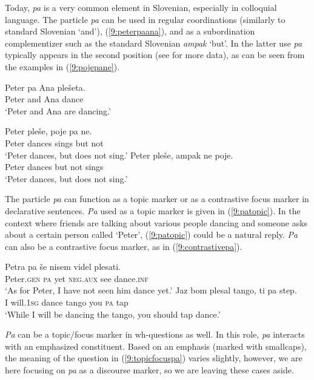 \documentclass[output=paper,
modfonts,
newtxmath,
hidelinks
]{langscibook}
\begin{document}
Today, \textit{pa} is a very common element in Slovenian, especially in colloquial language. The particle \textit{pa} can be used in regular coordinations (similarly to standard Slovenian `and'), (\ref{9:peterpaana}), and as a subordination complementizer such as the standard Slovenian \textit{ampak} `but'. In the latter use \textit{pa} typically appears in the second position (see \citealt{marusicetal2011pa} for more data), as can be seen from the examples in (\ref{9:pojepane}).

\begin{exe}
\ex \label{9:peterpaana}
\gll Peter 	pa Ana plešeta. \\
	Peter 	and Ana dance\\
\trans  `Peter and Ana are dancing.' 
\ex \label{9:pojepane}
\begin{xlist}
\ex \gll	Peter pleše, poje pa ne. \\
 		Peter 	dances sings but not\\
\trans `Peter dances, but does not sing.'
\ex \gll 	Peter pleše, ampak ne poje. \\
 	Peter 	dances but not sings\\
 \trans `Peter dances, but does not sing.'
\end{xlist}
\end{exe}

\noindent The particle \textit{pa} can function as a topic marker or as a contrastive focus marker in declarative sentences. \textit{Pa} used as a topic marker is given in (\ref{9:patopic}). In the context where friends are talking about various people dancing and someone asks about a certain person called `Peter', (\ref{9:patopic}) could be a natural reply. \textit{Pa} can also be a contrastive focus marker, as in (\ref{9:contrastivepa}). 

\begin{exe}
\ex \label{9:patopic}
\gll  Petra 	pa še nisem videl plesati.\\
 	Peter.\textsc{gen} 	\textsc{pa} yet \textsc{neg.aux} see dance.\textsc{inf} \\
\trans   `As for Peter, I have not seen him dance yet.' 
\ex \label{9:contrastivepa}
\gll Jaz bom plesal tango, ti pa step.\\
 	I will.\textsc{1sg} dance tango you \textsc{pa} tap\\
\trans   `While I will be dancing the tango, you should tap dance.' 
\end{exe}

\noindent \textit{Pa} can be a topic/focus marker in wh-questions as well. In this role, \textit{pa} interacts with an emphasized constituent. Based on an emphasis (marked with smallcaps), the meaning of the question in (\ref{9:topicfocuspa}) varies slightly, however, we are here focusing on \textit{pa} as a discourse marker, so we are leaving these cases aside.
\end{document}
